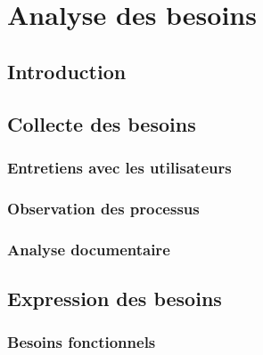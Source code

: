 
\chapter{Analyse des besoins}
\label{chap:besoins}

\section{Introduction}


\section{Collecte des besoins}


\subsection{Entretiens avec les utilisateurs}


\subsection{Observation des processus}


\subsection{Analyse documentaire}


\section{Expression des besoins}


\subsection{Besoins fonctionnels}



